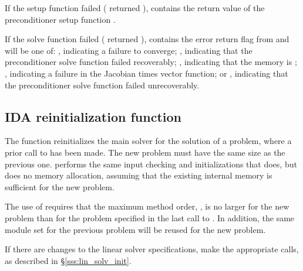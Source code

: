 {
  If the {\idasptfqmr} setup function failed ( 
  returned ),
   contains the return value of the preconditioner 
  setup function .

  If the {\idasptfqmr} solve function failed ( returned 
  ),  contains the error return flag from
   and will be one of:
  , indicating a failure to converge;
  , indicating that the preconditioner solve
  function  failed recoverably;
  , indicating that the {\sptfqmr} memory is ;
  , indicating a failure in the Jacobian times vector 
  function; or
  , indicating that the preconditioner solve
  function  failed unrecoverably.
}


\subsection{IDA reinitialization function}\label{sss:idareinit}

The function  reinitializes the main {\ida} solver for
the solution of a problem, where a prior call to  has
been made. The new problem must have the same size as the previous one.
 performs the same input checking and initializations 
that  does, but does no memory allocation, assuming that the 
existing internal memory is sufficient for the new problem.             
                                                                 
The use of  requires that the maximum method order,    
, is no larger for the new problem than for the problem  
specified in the last call to .  In addition, the same
{\nvector} module set for the previous problem
will be reused for the new problem.

If there are changes to the linear solver specifications, make the
appropriate  calls, as described in \S\ref{sss:lin_solv_init}.

